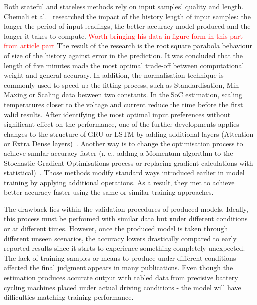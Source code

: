 %
Both stateful and stateless methods rely on input samples' quality and length.
Chemali et al.~\cite{Chemali2017} researched the impact of the history length of input samples: the longer the period of input readings, the better accuracy model produced and the longer it takes to compute.
\textcolor{red}{Worth bringing his data in figure form in this part from article part}
The result of the research is the root square parabola behaviour of size of the history against error in the prediction.
It was concluded that the length of five minutes made the most optimal trade-off between computational weight and general accuracy.
In addition, the normalisation technique is commonly used to speed up the fitting process, such as Standardisation, Min-Maxing or Scaling data between two constants.
In the SoC estimation, scaling temperatures closer to the voltage and current reduce the time before the first valid results.
After identifying the most optimal input preferences without significant effect on the performance, one of the further developments applies changes to the structure of GRU or LSTM by adding additional layers (Attention or Extra Dense layers)~\cite{mamo_long_2020, jiao_gru-rnn_2020}.
Another way is to change the optimisation process to achieve similar accuracy faster (i. e., adding a Momentum algorithm to the Stochastic Gradient Optimisations process or replacing gradient calculations with statistical)~\cite{xiao_accurate_2019, javid_adaptive_2020}.
Those methods modify standard ways introduced earlier in model training by applying additional operations.
As a result, they met to achieve better accuracy faster using the same or similar training approaches. 

%
The drawback lies within the validation procedures of produced models.
Ideally, this process must be performed with similar data but under different conditions or at different times.
However, once the produced model is taken through different unseen scenarios, the accuracy lowers drastically compared to early reported results since it starts to experience something completely unexpected.
The lack of training samples or means to produce under different conditions affected the final judgment appears in many publications. 
Even though the estimation produces accurate output with tabled data from precisive battery cycling machines placed under actual driving conditions - the model will have difficulties matching training performance. 

